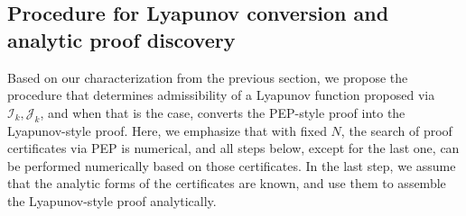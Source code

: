 \documentclass{article}
\theoremstyle{definition}
\theoremstyle{plain}
\newcommand{\cI}{{\mathcal{I}}}
\newcommand{\cJ}{{\mathcal{J}}}
\begin{document}
\subsection{Procedure for Lyapunov conversion and analytic proof discovery}
\label{section:Lyapunov-conversion-procedure}

Based on our characterization from the previous section, we propose the procedure that determines admissibility of a Lyapunov function proposed via $\cI_k, \cJ_k$, 
and when that is the case, converts the PEP-style proof into the Lyapunov-style proof.
Here, we emphasize that with fixed $N$, the search of proof certificates via PEP is numerical, and all steps below, except for the last one, can be performed numerically based on those certificates.
In the last step, we assume that the analytic forms of the certificates are known, and use them to assemble the Lyapunov-style proof analytically.
\end{document}
